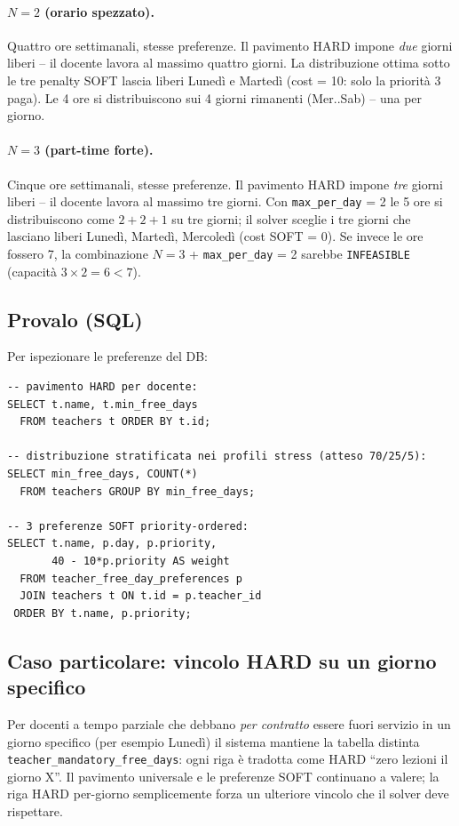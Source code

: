 \paragraph{$N = 2$ (orario spezzato).} Quattro ore
settimanali, stesse preferenze. Il pavimento HARD impone
\emph{due} giorni liberi -- il docente lavora al massimo
quattro giorni. La distribuzione ottima sotto le tre
penalty SOFT lascia liberi Luned\`i e Marted\`i (cost = 10:
solo la priorit\`a 3 paga). Le 4 ore si distribuiscono
sui 4 giorni rimanenti (Mer..Sab) -- una per giorno.

\paragraph{$N = 3$ (part-time forte).} Cinque ore
settimanali, stesse preferenze. Il pavimento HARD impone
\emph{tre} giorni liberi -- il docente lavora al massimo
tre giorni. Con \texttt{max\_per\_day} = 2 le 5 ore si
distribuiscono come $2 + 2 + 1$ su tre giorni; il solver
sceglie i tre giorni che lasciano liberi Luned\`i,
Marted\`i, Mercoled\`i (cost SOFT = 0). Se invece le ore
fossero 7, la combinazione $N = 3$ + \texttt{max\_per\_day} = 2
sarebbe \texttt{INFEASIBLE} (capacit\`a $3 \times 2 = 6 < 7$).

\subsection*{Provalo (SQL)}

Per ispezionare le preferenze del DB:
\begin{verbatim}
-- pavimento HARD per docente:
SELECT t.name, t.min_free_days
  FROM teachers t ORDER BY t.id;

-- distribuzione stratificata nei profili stress (atteso 70/25/5):
SELECT min_free_days, COUNT(*)
  FROM teachers GROUP BY min_free_days;

-- 3 preferenze SOFT priority-ordered:
SELECT t.name, p.day, p.priority,
       40 - 10*p.priority AS weight
  FROM teacher_free_day_preferences p
  JOIN teachers t ON t.id = p.teacher_id
 ORDER BY t.name, p.priority;
\end{verbatim}

\subsection*{Caso particolare: vincolo HARD su un giorno
specifico}

Per docenti a tempo parziale che debbano \emph{per
contratto} essere fuori servizio in un giorno specifico
(per esempio Luned\`i) il sistema mantiene la tabella
distinta \texttt{teacher\_mandatory\_free\_days}: ogni
riga \`e tradotta come HARD ``zero lezioni il giorno X''.
Il pavimento universale e le preferenze SOFT continuano a
valere; la riga HARD per-giorno semplicemente forza un
ulteriore vincolo che il solver deve rispettare.


